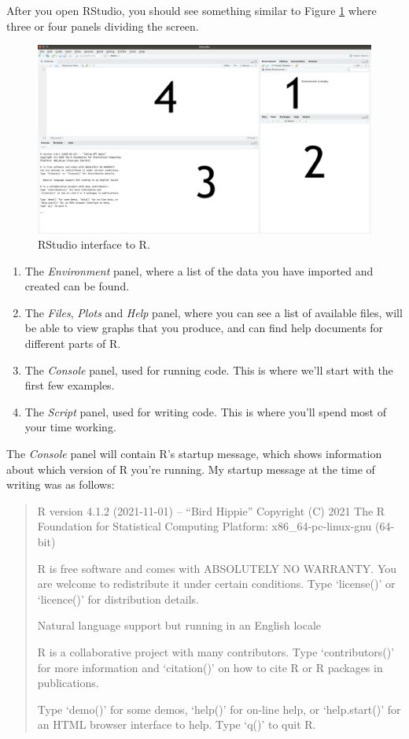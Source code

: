 \documentclass[
  12pt,
  oneside]{book}
\providecommand{\tightlist}{%
  \setlength{\itemsep}{0pt}\setlength{\parskip}{0pt}}
\begin{document}
After you open RStudio, you should see something similar to Figure \ref{fig:RStudio-interfacea} where three or four panels dividing the screen.

\begin{figure}
\includegraphics[width=0.93\linewidth]{fig/rstudio2} \caption{RStudio interface to R.}\label{fig:RStudio-interfacea}
\end{figure}

\begin{enumerate}
\def\labelenumi{\arabic{enumi}.}
\tightlist
\item
  The \emph{Environment} panel, where a list of the data you have imported and created can be found.
\item
  The \emph{Files}, \emph{Plots} and \emph{Help} panel, where you can see a list of available files, will be able to view graphs that you produce, and can find help documents for different parts of R.
\item
  The \emph{Console} panel, used for running code. This is where we'll start with the first few examples.
\item
  The \emph{Script} panel, used for writing code. This is where you'll spend most of your time working.
\end{enumerate}

The \emph{Console} panel will contain R's startup message, which shows information about which version of R you're running. My startup message at the time of writing was as follows:

\begin{quote}
R version 4.1.2 (2021-11-01) -- ``Bird Hippie''
Copyright (C) 2021 The R Foundation for Statistical Computing
Platform: x86\_64-pc-linux-gnu (64-bit)

R is free software and comes with ABSOLUTELY NO WARRANTY.
You are welcome to redistribute it under certain conditions.
Type `license()' or `licence()' for distribution details.

Natural language support but running in an English locale

R is a collaborative project with many contributors.
Type `contributors()' for more information and
`citation()' on how to cite R or R packages in publications.

Type `demo()' for some demos, `help()' for on-line help, or
`help.start()' for an HTML browser interface to help.
Type `q()' to quit R.
\end{quote}
\end{document}

